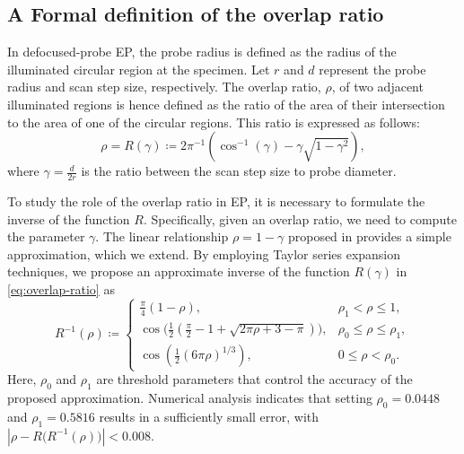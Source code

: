 \documentclass[11pt,draftclsnofoot,onecolumn]{IEEEtran}
\begin{document}
\subsection{A Formal definition of the overlap ratio}\label{sec:overlap-ratio}
In defocused-probe EP, the probe radius is defined as the radius of the illuminated circular region at the specimen. Let $r$ and $d$ represent the probe radius and scan step size, respectively. The overlap ratio, $\rho$, of two adjacent illuminated regions is hence defined as the ratio of the area of their intersection to the area of one of the circular regions. This ratio is expressed as follows:
 \begin{equation}\label{eq:overlap-ratio}
     \rho = R(\gamma) \coloneqq 2 \pi^{-1}(\cos^{-1}(\gamma) - \gamma \sqrt{1-\gamma^2}),
 \end{equation}
 where $\gamma = \frac{d}{2r}$ is the ratio between the scan step size to probe diameter. 

To study the role of the overlap ratio in EP, it is necessary to formulate the inverse of the function $R$. Specifically, given an overlap ratio, we need to compute the parameter $\gamma$. The linear relationship $\rho = 1- \gamma$ proposed  in \cite{bunk2008influence} provides a simple approximation, which we extend. By employing Taylor series expansion techniques, we propose an approximate inverse of the function $R(\gamma)$ in \eqref{eq:overlap-ratio} as
\begin{equation}\label{eq:overlap-ratio-approximation}
    R^{-1}(\rho)\! \coloneqq\!
\begin{cases}
\frac{\pi}{4}(1-\rho), &\!\!\! \rho_1 < \rho \le 1,\\
 \cos\big( \frac{1}{2}(\frac{\pi}{2}\! -\! 1\! +\! \sqrt{2\pi\rho + 3 - \pi})\big),&\!\!\!  \rho_0 \le \rho \le \rho_1,\\
\cos(\frac{1}{2}(6\pi\rho)^{1/3}), &  0\le \rho < \rho_0.
\end{cases}
\end{equation}
Here, $\rho_0$ and $\rho_1$ are threshold parameters that control the accuracy of the proposed approximation. Numerical analysis indicates that setting $\rho_0 = 0.0448$ and $\rho_1 = 0.5816$ results in a sufficiently small error, with $|\rho - R\big(R^{-1}(\rho)\big) | < 0.008$. 
\end{document}
